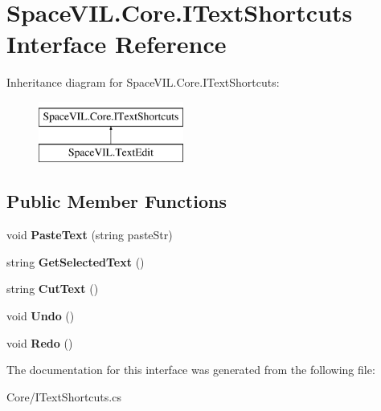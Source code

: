 \hypertarget{interface_space_v_i_l_1_1_core_1_1_i_text_shortcuts}{}\section{Space\+V\+I\+L.\+Core.\+I\+Text\+Shortcuts Interface Reference}
\label{interface_space_v_i_l_1_1_core_1_1_i_text_shortcuts}
Inheritance diagram for Space\+V\+I\+L.\+Core.\+I\+Text\+Shortcuts\+:\begin{figure}[H]
\begin{center}
\leavevmode
\includegraphics[height=2.000000cm]{interface_space_v_i_l_1_1_core_1_1_i_text_shortcuts}
\end{center}
\end{figure}
\subsection*{Public Member Functions}
\begin{DoxyCompactItemize}
\item 
\mbox{\label{interface_space_v_i_l_1_1_core_1_1_i_text_shortcuts_a264bd6b002a7ce1ef61487be85b39957}} 
void {\bfseries Paste\+Text} (string paste\+Str)
\item 
\mbox{\label{interface_space_v_i_l_1_1_core_1_1_i_text_shortcuts_aa58a2abec2bb04e3e0c9a0310c2aa682}} 
string {\bfseries Get\+Selected\+Text} ()
\item 
\mbox{\label{interface_space_v_i_l_1_1_core_1_1_i_text_shortcuts_aa7fc65c71de31bb76081e3a1829c2d6f}} 
string {\bfseries Cut\+Text} ()
\item 
\mbox{\label{interface_space_v_i_l_1_1_core_1_1_i_text_shortcuts_a565d1102bc5355ac8136e3c4344b9051}} 
void {\bfseries Undo} ()
\item 
\mbox{\label{interface_space_v_i_l_1_1_core_1_1_i_text_shortcuts_a4a26fab951b4fa02a0f79d9421940990}} 
void {\bfseries Redo} ()
\end{DoxyCompactItemize}


The documentation for this interface was generated from the following file\+:\begin{DoxyCompactItemize}
\item 
Core/I\+Text\+Shortcuts.\+cs\end{DoxyCompactItemize}
